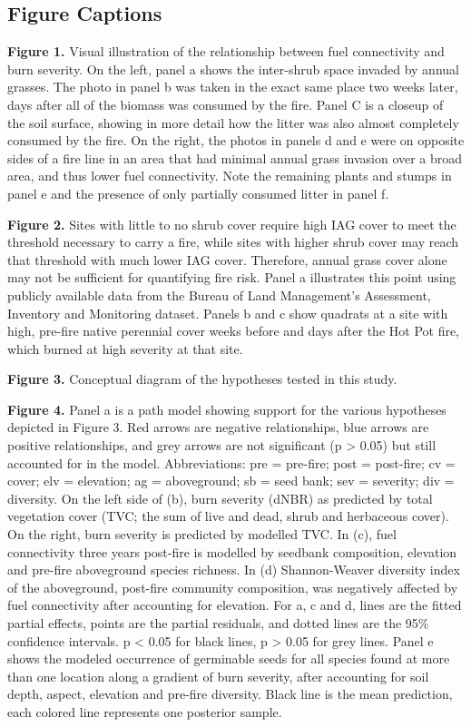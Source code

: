 \documentclass[
  12pt,
]{article}
\begin{document}
\newpage

\hypertarget{figure-captions}{%
\subsection{Figure Captions}\label{figure-captions}}

\textbf{Figure 1.} Visual illustration of the relationship between fuel
connectivity and burn severity. On the left, panel a shows the
inter-shrub space invaded by annual grasses. The photo in panel b was
taken in the exact same place two weeks later, days after all of the
biomass was consumed by the fire. Panel C is a closeup of the soil
surface, showing in more detail how the litter was also almost
completely consumed by the fire. On the right, the photos in panels d
and e were on opposite sides of a fire line in an area that had minimal
annual grass invasion over a broad area, and thus lower fuel
connectivity. Note the remaining plants and stumps in panel e and the
presence of only partially consumed litter in panel f.

\textbf{Figure 2.} Sites with little to no shrub cover require high IAG
cover to meet the threshold necessary to carry a fire, while sites with
higher shrub cover may reach that threshold with much lower IAG cover.
Therefore, annual grass cover alone may not be sufficient for
quantifying fire risk. Panel a illustrates this point using publicly
available data from the Bureau of Land Management's Assessment,
Inventory and Monitoring dataset. Panels b and c show quadrats at a site
with high, pre-fire native perennial cover weeks before and days after
the Hot Pot fire, which burned at high severity at that site.

\textbf{Figure 3.} Conceptual diagram of the hypotheses tested in this
study.

\textbf{Figure 4.} Panel a is a path model showing support for the
various hypotheses depicted in Figure 3. Red arrows are negative
relationships, blue arrows are positive relationships, and grey arrows
are not significant (p \textgreater{} 0.05) but still accounted for in
the model. Abbreviations: pre = pre-fire; post = post-fire; cv = cover;
elv = elevation; ag = aboveground; sb = seed bank; sev = severity; div =
diversity. On the left side of (b), burn severity (dNBR) as predicted by
total vegetation cover (TVC; the sum of live and dead, shrub and
herbaceous cover). On the right, burn severity is predicted by modelled
TVC. In (c), fuel connectivity three years post-fire is modelled by
seedbank composition, elevation and pre-fire aboveground species
richness. In (d) Shannon-Weaver diversity index of the aboveground,
post-fire community composition, was negatively affected by fuel
connectivity after accounting for elevation. For a, c and d, lines are
the fitted partial effects, points are the partial residuals, and dotted
lines are the 95\% confidence intervals. p \textless{} 0.05 for black
lines, p \textgreater{} 0.05 for grey lines. Panel e shows the modeled
occurrence of germinable seeds for all species found at more than one
location along a gradient of burn severity, after accounting for soil
depth, aspect, elevation and pre-fire diversity. Black line is the mean
prediction, each colored line represents one posterior sample.
\end{document}
